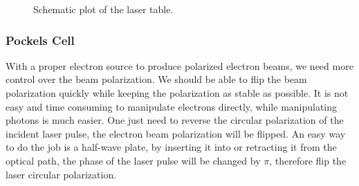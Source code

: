 \begin{figure}[!h]
    \caption{Schematic plot of the laser table.}
    \label{fig:laser_table}
\end{figure}

\subsubsection{Pockels Cell}
With a proper electron source to produce polarized electron beams, we need more control 
over the beam polarization. We should be able to flip the beam polarization
quickly while keeping the polarization as stable as possible. It is not easy and time
consuming to manipulate electrons directly, while manipulating photons is much 
easier. One just need to reverse the circular polarization of the incident laser pulse,
the electron beam polarization will be flipped. An easy way to do the job is
a half-wave plate, by inserting it into or retracting it from the optical path,
the phase of the laser pulse will be changed by $\pi$, therefore flip the laser
circular polarization. 

